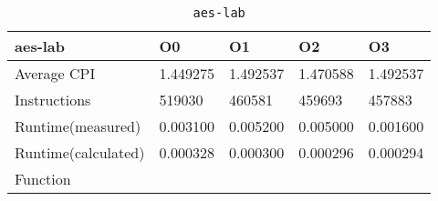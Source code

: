 \begin{table}[ht!]
\centering
\caption{\texttt{aes-lab}}
\label{tab:aes-lab}
\begin{tabular}{|l|l|l|l|l|}
\hline
\textbf{aes-lab}	&	\textbf{O0}	&	\textbf{O1}	&	\textbf{O2}	&	\textbf{O3}	\\\hline\hline
Average CPI	&	1.449275	&	1.492537	&	1.470588	&	1.492537	\\\hline
Instructions	&	519030	&	460581	&	459693	&	457883	\\\hline
Runtime(measured)	&	0.003100	&	0.005200	&	0.005000	&	0.001600	\\\hline
Runtime(calculated)	&	0.000328	&	0.000300	&	0.000296	&	0.000294	\\\hline
Function	&		&		&		&		\\\hline
\end{tabular}
\end{table}

